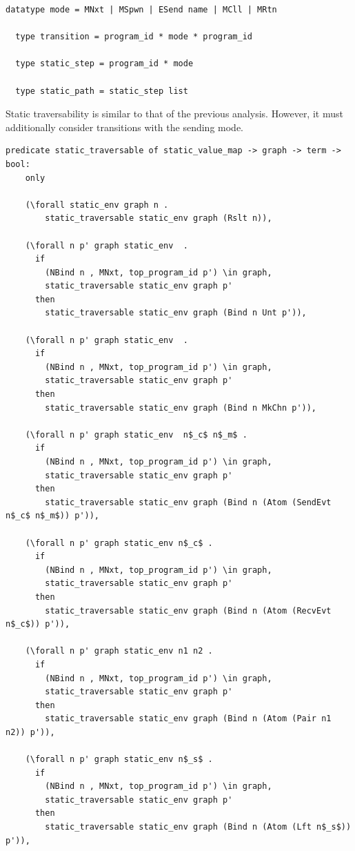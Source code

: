 \documentclass[10pt]{article}
\begin{document}
\begin{lstlisting}[language=logic, mathescape]
  datatype mode = MNxt | MSpwn | ESend name | MCll | MRtn

  type transition = program_id * mode * program_id

  type static_step = program_id * mode

  type static_path = static_step list
\end{lstlisting}

Static traversability is similar to that of the previous analysis.
However, it must additionally consider transitions with the sending mode. 

\begin{lstlisting}[language=logic, mathescape]
  predicate static_traversable of static_value_map -> graph -> term -> bool:
    only
    
    (\forall static_env graph n .
        static_traversable static_env graph (Rslt n)),

    (\forall n p' graph static_env  .
      if
        (NBind n , MNxt, top_program_id p') \in graph,
        static_traversable static_env graph p'
      then
        static_traversable static_env graph (Bind n Unt p')),

    (\forall n p' graph static_env  .
      if
        (NBind n , MNxt, top_program_id p') \in graph,
        static_traversable static_env graph p'
      then
        static_traversable static_env graph (Bind n MkChn p')),

    (\forall n p' graph static_env  n$_c$ n$_m$ .
      if
        (NBind n , MNxt, top_program_id p') \in graph,
        static_traversable static_env graph p'
      then
        static_traversable static_env graph (Bind n (Atom (SendEvt n$_c$ n$_m$)) p')),

    (\forall n p' graph static_env n$_c$ .
      if
        (NBind n , MNxt, top_program_id p') \in graph,
        static_traversable static_env graph p'
      then
        static_traversable static_env graph (Bind n (Atom (RecvEvt n$_c$)) p')),

    (\forall n p' graph static_env n1 n2 .
      if
        (NBind n , MNxt, top_program_id p') \in graph,
        static_traversable static_env graph p'
      then
        static_traversable static_env graph (Bind n (Atom (Pair n1 n2)) p')),

    (\forall n p' graph static_env n$_s$ .
      if
        (NBind n , MNxt, top_program_id p') \in graph,
        static_traversable static_env graph p'
      then
        static_traversable static_env graph (Bind n (Atom (Lft n$_s$)) p')),


\end{lstlisting}
\end{document}
